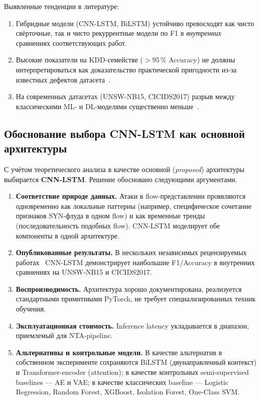 Выявленные тенденции в литературе:

\begin{enumerate}
    \item Гибридные модели (CNN-LSTM, BiLSTM) устойчиво превосходят
    как чисто свёрточные, так и чисто рекуррентные модели по F1 в
    \emph{внутренних} сравнениях соответствующих работ.
    \item Высокие показатели на KDD-семействе (\(>95\,\%\) Accuracy)
    не должны интерпретироваться как доказательство практической
    пригодности из-за известных дефектов
    датасета~\cite{tavallaee2009nslkdd, sommer2010outside}.
    \item На современных датасетах (UNSW-NB15, CICIDS2017) разрыв
    между классическими ML- и DL-моделями существенно
    меньше~\cite{ferrag2020dlcyber, ahmad2021nids}.
\end{enumerate}

\subsection{Обоснование выбора CNN-LSTM как основной архитектуры}
\label{subsec:cnn-lstm-rationale}

С учётом теоретического анализа в качестве основной
(\emph{proposed}) архитектуры выбирается \textbf{CNN-LSTM}. Решение
обосновано следующими аргументами.

\begin{enumerate}
    \item \textbf{Соответствие природе данных.} Атаки в
    flow-представлении проявляются одновременно как локальные
    паттерны (например, специфическое сочетание признаков
    SYN-флуда в одном flow) и как временные тренды
    (последовательность подобных flow). CNN-LSTM моделирует обе
    компоненты в одной архитектуре.
    \item \textbf{Опубликованные результаты.} В нескольких
    независимых рецензируемых работах~\cite{vinayakumar2019dl,
    ferrag2020dlcyber, liu2019survey, ahmad2021nids} CNN-LSTM
    демонстрирует наибольшие F1/Accuracy в внутренних сравнениях
    на UNSW-NB15 и CICIDS2017.
    \item \textbf{Воспроизводимость.} Архитектура хорошо
    документирована, реализуется стандартными примитивами PyTorch,
    не требует специализированных техник обучения.
    \item \textbf{Эксплуатационная стоимость.} Inference latency
    укладывается в диапазон, приемлемый для NTA-pipeline.
    \item \textbf{Альтернативы и контрольные модели.} В качестве
    альтернатив в собственном эксперименте сохраняются BiLSTM
    (двунаправленный контекст) и Transformer-encoder (attention);
    в качестве контрольных semi-supervised baselines --- AE и VAE;
    в качестве классических baseline --- Logistic Regression,
    Random Forest, XGBoost, Isolation Forest, One-Class SVM.
\end{enumerate}

